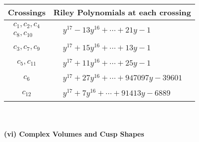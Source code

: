 \documentclass[1p]{elsarticle_modified}
\theoremstyle{definition}
\begin{document}
\begin{tabular}{m{50pt}|m{274pt}}
Crossings & \hspace{64pt}Riley Polynomials at each crossing \\
\hline $$\begin{aligned}c_{1},c_{2},c_{4}\\c_{8},c_{10}\end{aligned}$$&$\begin{aligned}
&y^{17}-13 y^{16}+\cdots+21 y-1
\end{aligned}$\\
\hline $$\begin{aligned}c_{3},c_{7},c_{9}\end{aligned}$$&$\begin{aligned}
&y^{17}+15 y^{16}+\cdots+13 y-1
\end{aligned}$\\
\hline $$\begin{aligned}c_{5},c_{11}\end{aligned}$$&$\begin{aligned}
&y^{17}+11 y^{16}+\cdots+25 y-1
\end{aligned}$\\
\hline $$\begin{aligned}c_{6}\end{aligned}$$&$\begin{aligned}
&y^{17}+27 y^{16}+\cdots+947097 y-39601
\end{aligned}$\\
\hline $$\begin{aligned}c_{12}\end{aligned}$$&$\begin{aligned}
&y^{17}+7 y^{16}+\cdots+91413 y-6889
\end{aligned}$\\
\hline
\end{tabular}\\~\\
\newpage\flushleft \textbf{(vi) Complex Volumes and Cusp Shapes}
\end{document}
